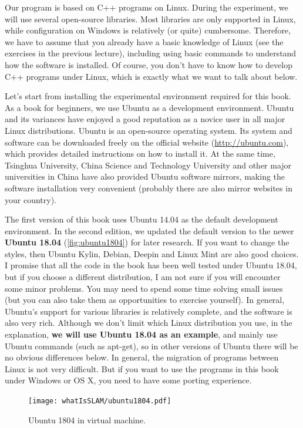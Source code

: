 Our program is based on C++ programs on Linux. During the experiment, we will use several open-source libraries. Most libraries are only supported in Linux, while configuration on Windows is relatively (or quite) cumbersome. Therefore, we have to assume that you already have a basic knowledge of Linux (see the exercises in the previous lecture), including using basic commands to understand how the software is installed. Of course, you don't have to know how to develop C++ programs under Linux, which is exactly what we want to talk about below.

Let's start from installing the experimental environment required for this book. As a book for beginners, we use Ubuntu as a development environment. Ubuntu and its variances have enjoyed a good reputation as a novice user in all major Linux distributions. Ubuntu is an open-source operating system. Its system and software can be downloaded freely on the official website (\url{http://ubuntu.com}), which provides detailed instructions on how to install it. At the same time, Tsinghua University, China Science and Technology University and other major universities in China have also provided Ubuntu software mirrors, making the software installation very convenient (probably there are also mirror websites in your country).

The first version of this book uses Ubuntu 14.04 as the default development environment. In the second edition, we updated the default version to the newer \textbf{Ubuntu 18.04} (\autoref{fig:ubuntu1804}) for later research. If you want to change the styles, then Ubuntu Kylin, Debian, Deepin and Linux Mint are also good choices. I promise that all the code in the book has been well tested under Ubuntu 18.04, but if you choose a different distribution, I am not sure if you will encounter some minor problems. You may need to spend some time solving small issues (but you can also take them as opportunities to exercise yourself). In general, Ubuntu's support for various libraries is relatively complete, and the software is also very rich. Although we don't limit which Linux distribution you use, in the explanation, \textbf{we will use Ubuntu 18.04 as an example}, and mainly use Ubuntu commands (such as apt-get), so in other versions of Ubuntu there will be no obvious differences below. In general, the migration of programs between Linux is not very difficult. But if you want to use the programs in this book under Windows or OS X, you need to have some porting experience.

\begin{figure}[!ht]
    \centering
    \texttt{[image: whatIsSLAM/ubuntu1804.pdf]}
    \caption{Ubuntu 1804 in virtual machine.}
    \label{fig:ubuntu1804}
\end{figure}

